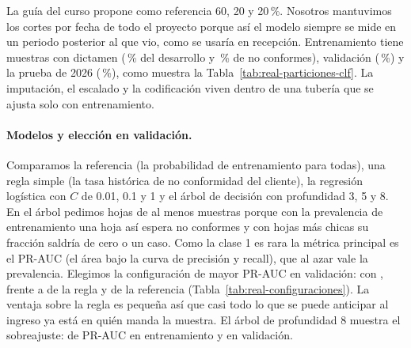 La guía del curso propone como referencia 60, 20 y 20\,\%. Nosotros
mantuvimos los cortes por fecha de todo el proyecto porque así el modelo
siempre se mide en un periodo posterior al que vio, como se usaría en
recepción. Entrenamiento tiene \RealRiesgoEntrenamiento{} muestras con
dictamen (\RealRiesgoEntrenamientoPct{}\,\% del desarrollo y
\RealRiesgoPrevalenciaEntPct{}\,\% de no conformes), validación
\RealRiesgoValidacion{} (\RealRiesgoPrevalenciaPct{}\,\%) y la prueba de 2026
\RealPruebaMuestras{} (\RealPruebaPrevalenciaPct{}\,\%), como muestra la
Tabla~\ref{tab:real-particiones-clf}. La imputación, el escalado y la
codificación viven dentro de una tubería que se ajusta solo con
entrenamiento.

\begin{table}[!htbp]
\centering
{}
\caption{Particiones del clasificador real con su tamaño y composición: La
prueba de 2026 trae clientes que no aparecen en el desarrollo y la mitad de
la no conformidad.}
\label{tab:real-particiones-clf}
\end{table}

\paragraph{Modelos y elección en validación.} Comparamos la referencia (la
probabilidad de entrenamiento para todas), una regla simple (la tasa
histórica de no conformidad del cliente), la regresión logística con
$C$ de 0.01, 0.1 y 1 y el árbol de decisión con profundidad 3, 5 y 8. En el
árbol pedimos hojas de al menos \RealRiesgoMinimoHoja{} muestras porque con
la prevalencia de entrenamiento una hoja así espera
\RealRiesgoHojaEsperados{} no conformes y con hojas más chicas su fracción
saldría de cero o un caso. Como la clase 1 es rara la métrica principal es
el PR-AUC (el área bajo la curva de precisión y recall), que al azar vale la
prevalencia. Elegimos la configuración de mayor PR-AUC en validación:
\RealRiesgoElegido{} con \RealRiesgoAPElegido{}, frente a
\RealRiesgoAPHistoria{} de la regla y \RealRiesgoAPBase{} de la referencia
(Tabla~\ref{tab:real-configuraciones}). La ventaja sobre la regla es
pequeña así que casi todo lo que se puede anticipar al ingreso ya está en
quién manda la muestra. El árbol de profundidad 8 muestra el sobreajuste:
\RealRiesgoAPArbolProfundoEnt{} de PR-AUC en entrenamiento y
\RealRiesgoAPArbolProfundoVal{} en validación.

\begin{table}[!htbp]
\centering
{}
\caption{Las ocho configuraciones en entrenamiento y en validación, con
precisión, recall y F1 en el umbral de menor costo en validación de cada
una: La regresión logística tiene el mayor PR-AUC en validación y el árbol
profundo se sobreajusta.}
\label{tab:real-configuraciones}
\end{table}


